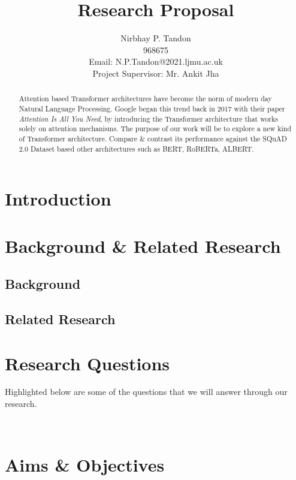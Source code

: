 \documentclass[11pt]{article}
\begin{document}
\title{Research Proposal}

\author{Nirbhay P. Tandon\\968675\\Email: N.P.Tandon@2021.ljmu.ac.uk\\
Project Supervisor: Mr. Ankit Jha
}
\date{}
\maketitle


\begin{abstract}
Attention based Transformer architectures have become the norm of modern day Natural Language Processing. Google began this trend back in 2017 with their paper \textit{Attention Is All You Need}\cite{atayl}, by introducing the Transformer architecture that works solely on attention mechanisms. The purpose of our work will be to explore a new kind of Transformer architecture. Compare \& contrast its performance against the SQuAD 2.0 Dataset\cite{dataset} based other architectures such as BERT\cite{bert}, RoBERTa\cite{roberta}, ALBERT.
\end{abstract}
\newpage
\tableofcontents
\newpage
\section{Introduction}\label{Introduction}

\section{Background \& Related Research}\label{Section-Frameworks}

\subsection{Background}
\subsection{Related Research}

\newpage
\section{Research Questions}\label{Section-Conclusions}
Highlighted below are some of the questions that we will answer through our research.

\
\newpage
\section{Aims \& Objectives}
\end{document}
